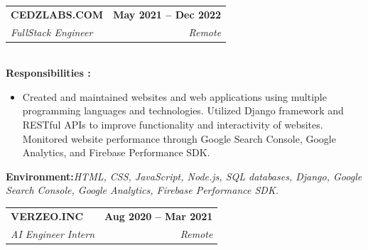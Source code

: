 \documentclass[letterpaper,11pt]{article}
\makeatletter
\newcommand{\resumeItem}[1]{
  \item\small{
    {#1 \vspace{-2pt}}
  }
}
\newcommand{\resumeSubheading}[4]{
  \vspace{-2pt}\item
    \begin{tabular*}{1.0\textwidth}[t]{l@{\extracolsep{\fill}}r}
      \textbf{#1} & \textbf{\small #2} \\
      \textit{\small#3} & \textit{\small #4} \\
    \end{tabular*}\vspace{-7pt}
}
\newcommand{\resumeItemListStart}{\begin{itemize}}
\newcommand{\resumeItemListEnd}{\end{itemize}\vspace{-5pt}}
\makeatother
\begin{document}
    \resumeSubheading
      {CEDZLABS.COM}{May 2021 -- Dec 2022}
      {FullStack Engineer}{\faMapMarker Remote}\\
      \vspace{10pt}
\textbf{Responsibilities : }
        \vspace{-10pt}
      \resumeItemListStart
      \resumeItem{Created and maintained websites and web applications using multiple programming languages and technologies. Utilized Django framework and RESTful APIs to improve functionality and interactivity of websites. Monitored website performance through Google Search Console, Google Analytics, and Firebase Performance SDK.}
        \vspace{-3pt}
      \resumeItemListEnd
\textbf{Environment:}\emph{HTML, CSS, JavaScript, Node.js, SQL databases, Django, Google Search Console, Google Analytics, Firebase Performance SDK.}
  
    \resumeSubheading
      {VERZEO.INC}{Aug 2020 -- Mar 2021}
      {AI Engineer Intern}{ \faMapMarker Remote}\\
      \vspace{10pt}
\end{document}
